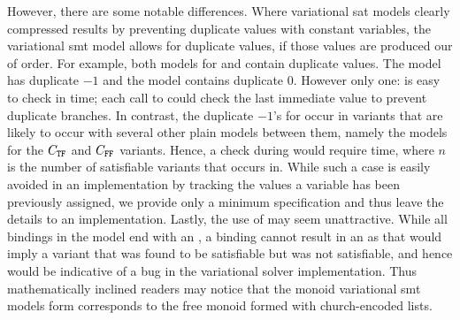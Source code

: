 However, there are some notable differences. Where variational \ac{sat} models
clearly compressed results by preventing duplicate values with constant
variables, the variational \ac{smt} model allows for duplicate values, if those
values are produced our of order. For example, both models for \iV{} and \cV{}
contain duplicate values. The \iV{} model has duplicate $-1$ and the \cV{} model
contains duplicate $0$. However only one: \cV{} is easy to check in 
time; each call to  could check the last immediate value to prevent
duplicate branches. In contrast, the duplicate $-1$'s for \iV{} occur in
variants that are likely to occur with several other plain models between them,
namely the models for the $C_{\texttt{T}\texttt{F}}$ and $C_{\texttt{F}\texttt{F}}$ variants. Hence, a
check during  would require  time, where $n$ is the number
of satisfiable variants that \iV{} occurs in. While such a case is easily
avoided in an implementation by tracking the values a variable has been
previously assigned, we provide only a minimum specification and thus leave the
details to an implementation.
%
Lastly, the use of \undefined may seem unattractive. While all bindings in the
model end with an \undefined, a binding cannot result in an \undefined{} as that
would imply a variant that was found to be satisfiable but was not satisfiable,
and hence would be indicative of a bug in the variational solver implementation.
Thus mathematically inclined readers may notice that the monoid variational
\ac{smt} models form corresponds to the free monoid formed with church-encoded
lists.


